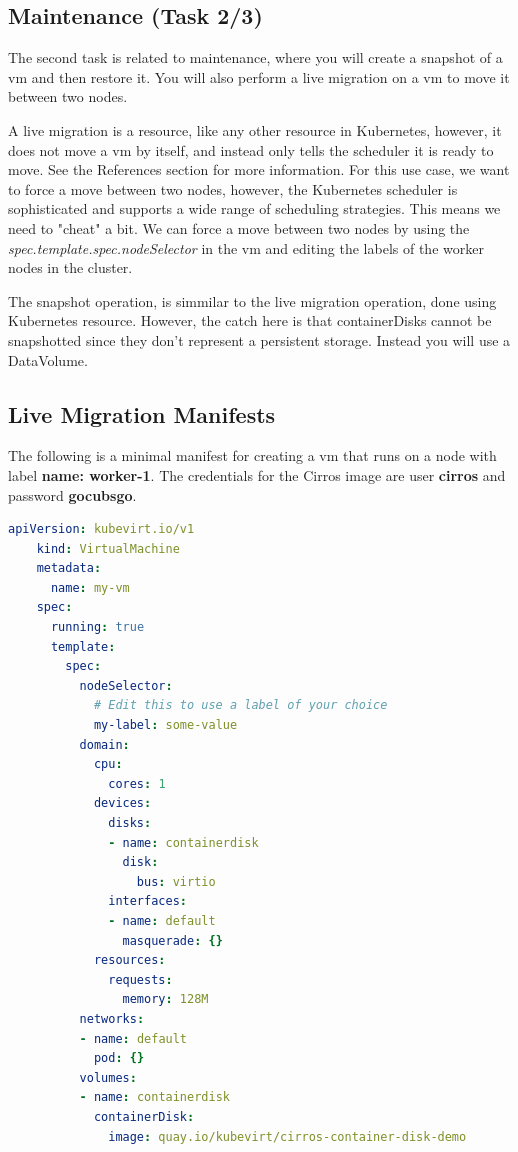 \documentclass{kththesis}
\begin{document}
\begin{enumerate}
\section*{Maintenance (Task 2/3)}
The second task is related to maintenance, where you will create a snapshot of a \Gls{vm} and then restore it. You will also perform a live migration on a \Gls{vm} to move it between two nodes. 

A live migration is a resource, like any other resource in Kubernetes, however, it does not move a \Gls{vm} by itself, and instead only tells the scheduler it is ready to move. See the References section for more information. For this use case, we want to force a move between two nodes, however, the Kubernetes scheduler is sophisticated and supports a wide range of scheduling strategies. This means we need to "cheat" a bit. We can force a move between two nodes by using the \textit{spec.template.spec.nodeSelector} in the \Gls{vm} and editing the labels of the worker nodes in the cluster. 

The snapshot operation, is simmilar to the live migration operation, done using Kubernetes resource. However, the catch here is that containerDisks cannot be snapshotted since they don't represent a persistent storage. Instead you will use a DataVolume.

\subsection*{Live Migration Manifests}
The following is a minimal manifest for creating a \Gls{vm} that runs on a node with label \textbf{name: worker-1}. The credentials for the Cirros image are user \textbf{cirros} and password \textbf{gocubsgo}.
\begin{lstlisting}[language=yaml]
    apiVersion: kubevirt.io/v1
    kind: VirtualMachine
    metadata:
      name: my-vm
    spec:
      running: true
      template:
        spec:
          nodeSelector:
            # Edit this to use a label of your choice
            my-label: some-value
          domain:
            cpu:
              cores: 1
            devices:
              disks:
              - name: containerdisk
                disk:
                  bus: virtio
              interfaces:
              - name: default
                masquerade: {}
            resources:
              requests:
                memory: 128M
          networks:
          - name: default
            pod: {}
          volumes:
          - name: containerdisk
            containerDisk:
              image: quay.io/kubevirt/cirros-container-disk-demo
\end{lstlisting}


\end{enumerate}
\end{document}
